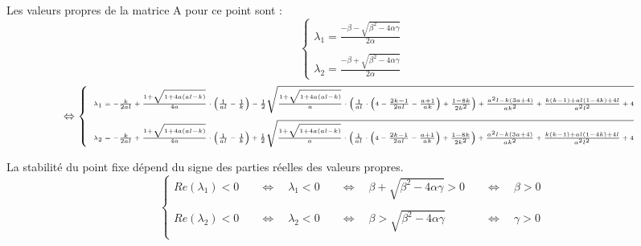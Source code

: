 \documentclass{article}
\begin{document}
Les valeurs propres de la matrice A pour ce point sont  : 
\begin{equation*}
    \left \{
    \begin{array}{l}
        \lambda_{1} = \frac{- \beta - \sqrt{\beta^{2} - 4 \alpha \gamma}}{2\alpha}\\\\
        \lambda_{2} = \frac{- \beta + \sqrt{\beta^{2} - 4 \alpha \gamma}}{2\alpha} 
    \end{array}
    \right.
\end{equation*}
\begin{equation*}
    \Leftrightarrow
    \tiny
    \left \{
    \begin{array}{l}
        \lambda_{1} =  - \frac{k}{2al} + \frac{1 + \sqrt{1 + 4a(al -k)}}{4a} \cdot \left( \frac{1}{al} - \frac{1}{k} \right) - 
        \frac{1}{2} \sqrt{\frac{1 + \sqrt{1 + 4a(al -k)}}{a} \cdot \left( \frac{1}{al} \cdot \left( 4 - \frac{2k-1}{2al} - \frac{a+1}{ak} \right) + \frac{1-8k}{2k^2} \right) + \frac{a^2 l - k (3a+4)}{ak^2} + \frac{k(k-1) + al(1-4k) + 4l}{a^2 l^2} + 4}
        \\\\
        \lambda_{2} = - \frac{k}{2al} + \frac{1 + \sqrt{1 + 4a(al -k)}}{4a} \cdot \left( \frac{1}{al} - \frac{1}{k} \right) +
        \frac{1}{2} \sqrt{\frac{1 + \sqrt{1 + 4a(al -k)}}{a} \cdot \left( \frac{1}{al} \cdot \left( 4 - \frac{2k-1}{2al} - \frac{a+1}{ak} \right) + \frac{1-8k}{2k^2} \right) + \frac{a^2 l - k (3a+4)}{ak^2} + \frac{k(k-1) + al(1-4k) + 4l}{a^2 l^2} + 4}
        \\
    \end{array}
    \right.
\end{equation*}

La stabilité du point fixe dépend du signe des parties réelles des valeurs propres.\\
\begin{equation*}
\left \{
    \begin{array}{llll}
        Re(\lambda_{1}) < 0 &
        \quad \Leftrightarrow \quad \lambda_{1} < 0 &
        \quad \Leftrightarrow \quad \beta + \sqrt{\beta^{2} - 4 \alpha \gamma} > 0 &
        \quad \Leftrightarrow \quad \beta > 0 \\\\
        Re(\lambda_{2}) < 0 &
        \quad \Leftrightarrow \quad \lambda_{2} < 0 &
        \quad \Leftrightarrow \quad \beta > \sqrt{\beta^{2} - 4 \alpha \gamma} &
        \quad \Leftrightarrow \quad \gamma > 0 \\
    \end{array}
\right.
\end{equation*}
\end{document}
